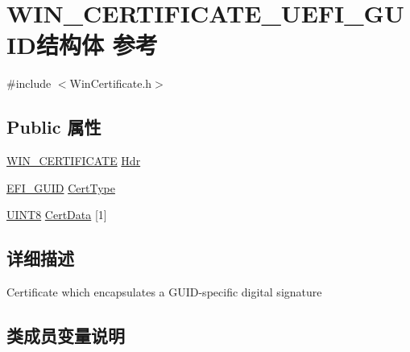 \hypertarget{struct_w_i_n___c_e_r_t_i_f_i_c_a_t_e___u_e_f_i___g_u_i_d}{}\section{W\+I\+N\+\_\+\+C\+E\+R\+T\+I\+F\+I\+C\+A\+T\+E\+\_\+\+U\+E\+F\+I\+\_\+\+G\+U\+I\+D结构体 参考}
\label{struct_w_i_n___c_e_r_t_i_f_i_c_a_t_e___u_e_f_i___g_u_i_d}


{\ttfamily \#include $<$Win\+Certificate.\+h$>$}

\subsection*{Public 属性}
\begin{DoxyCompactItemize}
\item 
\hyperlink{struct_w_i_n___c_e_r_t_i_f_i_c_a_t_e}{W\+I\+N\+\_\+\+C\+E\+R\+T\+I\+F\+I\+C\+A\+TE} \hyperlink{struct_w_i_n___c_e_r_t_i_f_i_c_a_t_e___u_e_f_i___g_u_i_d_a9e84f05a12da0a0d7c8cdf5e7ef41923}{Hdr}
\item 
\hyperlink{_uefi_base_type_8h_ad87614428813f71edb2c2d802e9ce2af}{E\+F\+I\+\_\+\+G\+U\+ID} \hyperlink{struct_w_i_n___c_e_r_t_i_f_i_c_a_t_e___u_e_f_i___g_u_i_d_ac3b2eb1432189b3d8e038dc32635bf9e}{Cert\+Type}
\item 
\hyperlink{_processor_bind_8h_ab27e9918b538ce9d8ca692479b375b6a}{U\+I\+N\+T8} \hyperlink{struct_w_i_n___c_e_r_t_i_f_i_c_a_t_e___u_e_f_i___g_u_i_d_a83f456b4e18459e7bb882c05941e6653}{Cert\+Data} \mbox{[}1\mbox{]}
\end{DoxyCompactItemize}


\subsection{详细描述}
Certificate which encapsulates a G\+U\+I\+D-\/specific digital signature 

\subsection{类成员变量说明}
\mbox{\label{struct_w_i_n___c_e_r_t_i_f_i_c_a_t_e___u_e_f_i___g_u_i_d_a83f456b4e18459e7bb882c05941e6653}} 
